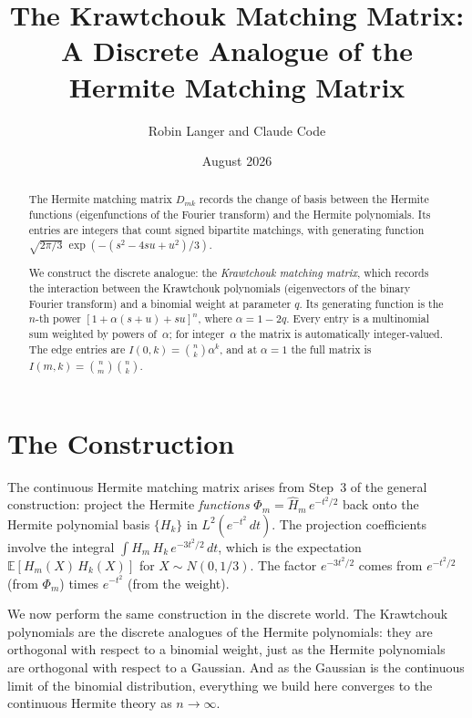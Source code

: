 \documentclass[11pt,a4paper]{article}
\title{\textbf{The Krawtchouk Matching Matrix:\\
A Discrete Analogue of the\\
Hermite Matching Matrix}}
\author{Robin Langer and Claude Code}
\date{August 2026}
\theoremstyle{plain}
\theoremstyle{definition}
\begin{document}
\maketitle

\begin{abstract}
The Hermite matching matrix $D_{mk}$ records the change of basis
between the Hermite functions (eigenfunctions of the Fourier
transform) and the Hermite polynomials. Its entries are integers
that count signed bipartite matchings, with generating function
$\sqrt{2\pi/3}\;\exp(-(s^2 - 4su + u^2)/3)$.

We construct the discrete analogue: the \emph{Krawtchouk matching
matrix}, which records the interaction between the Krawtchouk
polynomials (eigenvectors of the binary Fourier transform) and a
binomial weight at parameter $q$. Its generating function is the
$n$-th power $[1 + \alpha(s+u) + su]^n$, where $\alpha = 1 - 2q$.
Every entry is a multinomial sum weighted by powers of~$\alpha$;
for integer~$\alpha$ the matrix is automatically integer-valued.
The edge entries are $I(0,k) = \binom{n}{k}\alpha^k$, and at
$\alpha = 1$ the full matrix is $I(m,k) = \binom{n}{m}\binom{n}{k}$.
\end{abstract}

\section{The Construction}

\begin{tcolorbox}[breakable, colback=yellow!10, colframe=yellow!10,
  boxrule=0pt, sharp corners]
The continuous Hermite matching matrix arises from Step~3 of the
general construction: project the Hermite \emph{functions}
$\Phi_m = \widehat H_m\, e^{-t^2/2}$ back onto the Hermite
polynomial basis $\{H_k\}$ in $L^2(e^{-t^2}\, dt)$. The projection
coefficients involve the integral
$\int H_m\, H_k\, e^{-3t^2/2}\, dt$,
which is the expectation $\mathbb{E}[H_m(X)\, H_k(X)]$ for
$X \sim N(0, 1/3)$. The factor $e^{-3t^2/2}$ comes from
$e^{-t^2/2}$ (from $\Phi_m$) times $e^{-t^2}$ (from the weight).

We now perform the same construction in the discrete world. The
Krawtchouk polynomials are the discrete analogues of the Hermite
polynomials: they are orthogonal with respect to a binomial weight,
just as the Hermite polynomials are orthogonal with respect to a
Gaussian. And as the Gaussian is the continuous limit of the
binomial distribution, everything we build here converges to the
continuous Hermite theory as $n \to \infty$.
\end{tcolorbox}
\end{document}
